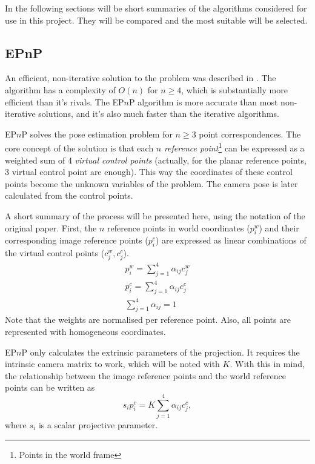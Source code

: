 In the following sections will be short summaries of the algorithms considered for use in this project.
They will be compared and the most suitable will be selected.

\subsection{EPnP}

An efficient, non-iterative solution to the problem was described in \cite{Lepetit2008}.
The algorithm has a complexity of $O(n)$ for $n\geq4$, which is substantially more efficient than it's rivals.
The EP$n$P algorithm is more accurate than most non-iterative solutions, and it's also much faster than the iterative algorithms.

EP$n$P solves the pose estimation problem for $n\geq3$ point correspondences.
The core concept of the solution is that each $n$ \textit{reference point}\footnote{Points in the world frame} can be expressed as a weighted sum of 4 \textit{virtual control points}\cite{Lepetit2008} (actually, for the planar reference points, 3 virtual control point are enough).
This way the coordinates of these control points become the unknown variables of the problem.
The camera pose is later calculated from the control points.

A short summary of the process will be presented here, using the notation of the original paper\cite{Lepetit2008}.
First, the $n$ reference points in world coordinates ($p_i^w$) and their corresponding image reference points ($p_i^c$) are expressed as linear combinations of the virtual control points ($c_j^w, c_j^c$).
\begin{align}
	p_i^w = \sum_{j=1}^{4} \alpha_{ij} c_j^w \\ 
	p_i^c = \sum_{j=1}^{4} \alpha_{ij} c_j^c \\
	\sum_{j=1}^{4} \alpha_{ij} = 1
\end{align}
Note that the weights are normalised per reference point.
Also, all points are represented with homogeneous coordinates.

EP$n$P only calculates the extrinsic parameters of the projection.
It requires the intrinsic camera matrix to work, which will be noted with $K$.
With this in mind, the relationship between the image reference points and the world reference points can be written as
\begin{equation}
	s_i p_i^c = K \sum_{j=1}^{4} \alpha_{ij} c_j^c,
	\label{eq:controlPointProj}
\end{equation}
where $s_i$ is a scalar projective parameter.

